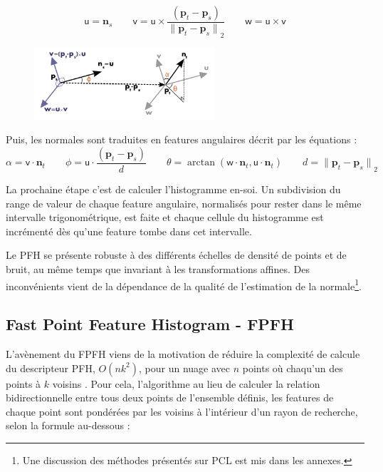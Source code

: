 \begin{equation*}
  {\mathsf u} = \boldsymbol{n}_s \qquad
  {\mathsf v} =  {\mathsf u} \times \frac{(\boldsymbol{p}_t-\boldsymbol{p}_s)}{{\|\boldsymbol{p}_t-\boldsymbol{p}_s\|}_{2}}  \qquad
  {\mathsf w} = {\mathsf u} \times {\mathsf v}
\end{equation*}

\begin{figure}[H]
  \centering
  \includegraphics[width=0.6\textwidth]{pfh_frame.png}
\end{figure}


Puis, les normales sont traduites en features angulaires décrit par les équations :
\begin{equation*}
  \alpha = {\mathsf v} \cdot \boldsymbol{n}_t  \qquad
  \phi   = {\mathsf u} \cdot \frac{(\boldsymbol{p}_t - \boldsymbol{p}_s)}{d} \qquad
  \theta = \arctan ({\mathsf w} \cdot \boldsymbol{n}_t, {\mathsf u} \cdot \boldsymbol{n}_t) \qquad
  d={\|\boldsymbol{p}_t-\boldsymbol{p}_s\|}_2 
\end{equation*}

La prochaine étape c'est de calculer l'histogramme en-soi. Un
subdivision du range de valeur de chaque feature angulaire, 
normalisés pour rester dans le même intervalle trigonométrique,
est faite et chaque cellule du histogramme est incrémenté dès
qu'une feature tombe dans cet intervalle. 

Le PFH se présente robuste à des différents échelles de densité de points et de bruit, au même temps que invariant à les transformations affines. Des inconvénients vient de la dépendance de la qualité de l'estimation de la normale\footnote{ Une discussion des méthodes présentés sur PCL est mis dans les annexes.}.

\subsection{Fast Point Feature Histogram - FPFH}

L'avènement du FPFH viens de la motivation de réduire la complexité de
calcule du descripteur PFH, $ O(nk^2) $, pour un nuage avec $n$ points 
où chaqu'un des points à $k$ voisins . Pour cela, l'algorithme au
lieu de calculer la relation bidirectionnelle entre tous deux points 
de l’ensemble définis, les features de chaque point sont pondérées 
par les voisins à l'intérieur d'un rayon de recherche, selon la formule
au-dessous :

